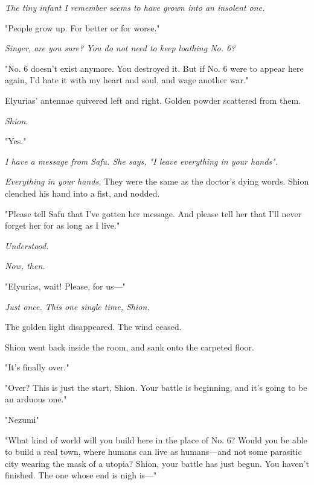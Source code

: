 \myspace

\emph{The tiny infant I remember seems to have grown into an insolent one.}

\myspace

"People grow up. For better or for worse."

\myspace

\emph{Singer, are you sure? You do not need to keep loathing No. 6?}

\myspace

"No. 6 doesn't exist anymore. You destroyed it. But if No. 6 were to
appear here again, I'd hate it with my heart and soul, and wage another
war."

Elyurias' antennae quivered left and right. Golden powder scattered from
them.

\myspace

\emph{Shion.}

\myspace

"Yes."

\myspace

\emph{I have a message from Safu. She says, "I leave everything in your
hands".}

\myspace

\emph{Everything in your hands.} They were the same as the doctor's dying
words. Shion clenched his hand into a fist, and nodded.

"Please tell Safu that I've gotten her message. And please tell her that
I'll never forget her for as long as I live."

\myspace

\emph{Understood.}

\emph{Now, then.}

\myspace

"Elyurias, wait! Please, for us---"

\myspace

\emph{Just once. This one single time, Shion.}

\myspace

The golden light disappeared. The wind ceased.

\myspace

Shion went back inside the room, and sank onto the carpeted floor.

"It's finally over."

"Over? This is just the start, Shion. Your battle is beginning, and it's
going to be an arduous one."

"Nezumi\el "

"What kind of world will you build here in the place of No. 6? Would you
be able to build a real town, where humans can live as humans---and not
some parasitic city wearing the mask of a utopia? Shion, your battle has
just begun. You haven't finished. The one whose end is nigh is---"

